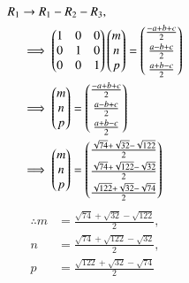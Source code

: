 \documentclass[journal,12pt,twocolumn]{IEEEtran}
\theoremstyle{remark}
\begin{document}
\begin{align}
    R_1 &\rightarrow R_1-R_2-R_3,\\
    &\implies\myvec{1&0&0\\0&1&0\\0&0&1}\myvec{m\\n\\p} = \myvec{\frac{-a+b+c}{2}\vspace{0.1cm}\\\frac{a-b+c}{2}\vspace{0.1cm}\\\frac{a+b-c}{2}}\\
    &\implies\myvec{m\\n\\p} = \myvec{\frac{-a+b+c}{2}\vspace{0.1cm}\\\frac{a-b+c}{2}\vspace{0.1cm}\\\frac{a+b-c}{2}}\\
    &\implies\myvec{m\\n\\p} = \myvec{\frac{\sqrt{74}+\sqrt{32}-\sqrt{122}}{2}\vspace{0.1cm}\\\frac{\sqrt{74}+\sqrt{122}-\sqrt{32}}{2}\vspace{0.1cm}\\\frac{\sqrt{122}+\sqrt{32}-\sqrt{74}}{2}}
\end{align}
\begin{align}
    \therefore
    m&= \frac{\sqrt{74}+\sqrt{32}-\sqrt{122}}{2},\\
    n&= \frac{\sqrt{74}+\sqrt{122}-\sqrt{32}}{2},\\
    p&= \frac{\sqrt{122}+\sqrt{32}-\sqrt{74}}{2}
\end{align}
\end{document}
